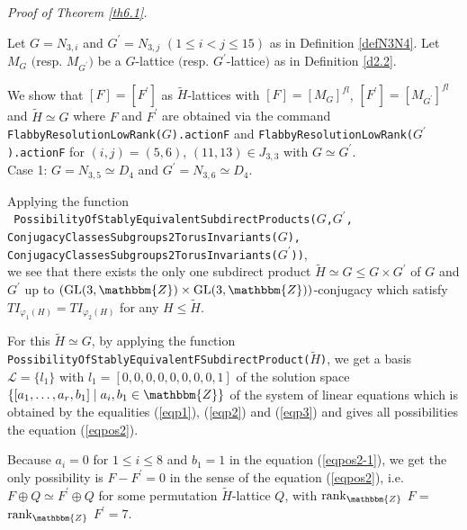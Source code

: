 \documentclass{amsart}
\theoremstyle{plain}
\theoremstyle{definition}
\theoremstyle{remark}
\newcommand{\bZ}{\mathbbm{Z}}\newcommand{\bQ}{\mathbbm{Q}}
\newcommand{\GL}{{\rm GL}}\newcommand{\SL}{{\rm SL}}
\newcounter{sub}\def\tr{\mbox{tr }}
\begin{document}
{\it Proof of Theorem \ref{th6.1}.}

Let $G=N_{3,i}$ and $G^\prime=N_{3,j}$ $(1\leq i<j\leq 15)$ 
as in Definition \ref{defN3N4}. 
Let $M_{G}$ $($resp. $M_{G^\prime}$$)$ be a $G$-lattice 
$($resp. $G^\prime$-lattice$)$ as in Definition \ref{d2.2}. 

We show that $[F]=[F^\prime]$ as $\widetilde{H}$-lattices 
with $[F]=[M_G]^{fl}$, $[F^\prime]=[M_{G^\prime}]^{fl}$ 
and $\widetilde{H}\simeq G$ 
where $F$ and $F^\prime$ are obtained via the command 
{\tt FlabbyResolutionLowRank($G$).actionF} 
and 
{\tt FlabbyResolutionLowRank($G^\prime$).actionF} 
for $(i,j)=(5,6)$, $(11,13)\in J_{3,3}$ with $G\simeq G^\prime$.\\ 

Case 1: $G=N_{3,5}\simeq D_4$ and $G^\prime=N_{3,6}\simeq D_4$.

Applying the function\\ 
{\tt 
PossibilityOfStablyEquivalentSubdirectProducts($G$,$G^\prime$,\\
ConjugacyClassesSubgroups2TorusInvariants($G$),\\
ConjugacyClassesSubgroups2TorusInvariants($G^\prime$))},\\  
we see that there exists the only one subdirect product 
$\widetilde{H}\simeq G\leq G\times G^\prime$ of $G$ and $G^\prime$ 
up to $(\GL(3,\bZ)\times \GL(3,\bZ))$-conjugacy 
which satisfy $TI_{\varphi_1(H)}=TI_{\varphi_2(H)}$ 
for any $H\leq \widetilde{H}$. 

For this $\widetilde{H}\simeq G$, 
by applying the function 
{\tt PossibilityOfStablyEquivalentFSubdirectProduct($\widetilde{H}$)}, 
we get a basis 
$\mathcal{L}=\{l_1\}$ with $l_1=[0,0,0,0,0,0,0,0,1]$ 
of the solution space 
$\{[a_1,\ldots,a_r,b_1]\mid a_i, b_1\in\bZ\}$ 
of the system of linear equations which is obtained by the equalities 
(\ref{eqp1}), (\ref{eqp2}) and (\ref{eqp3}) 
and gives all possibilities the equation (\ref{eqpos2}).

Because $a_i=0$ for $1\leq i\leq 8$ and 
$b_1=1$ in the equation (\ref{eqpos2-1}), 
we get the only possibility is $F-F^\prime=0$ 
in the sense of the equation (\ref{eqpos2}), 
i.e. $F\oplus Q\simeq F^\prime\oplus Q$ for some permutation 
$\widetilde{H}$-lattice $Q$, 
with ${\rm rank}_{\bZ}$ $F=$ ${\rm rank}_{\bZ}$ $F^\prime=7$. 
\end{document}
